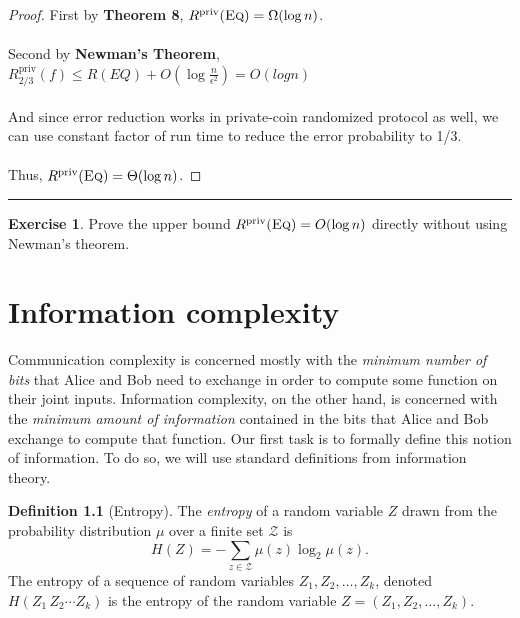 \documentclass[11pt,oneside]{book}
\theoremstyle{plain}
\theoremstyle{definition}
\newtheorem{definition}{Definition}
\newtheorem{exercise}{Exercise}
\theoremstyle{plain}
\newcommand{\calZ}{\mathcal{Z}}
\newcommand{\Eq}{\textsc{Eq}}
\newcommand{\Rpriv}{R^{\mathrm{priv}}}
\newcommand{\exercises}{\bigskip \noindent\rule{8cm}{0.4pt} \medskip}
\begin{document}
\begin{proof}
	First by \textbf{Theorem 8}, $\Rpriv(\Eq) = \Omega( \log n)$.\\
	\\
	Second by \textbf{Newman's Theorem}, $\Rpriv_{2/3}(f) \le R(EQ) + O\left(\log \frac{n}{\epsilon^2}\right) = O(logn)$\\
	\\
	And since error reduction works in private-coin randomized protocol as well, we can use constant factor of run time to reduce the error probability to 1/3.\\
	\\
	Thus, $\Rpriv(\Eq) = \Theta( \log n)$.
\end{proof}

\exercises

\begin{exercise}
	Prove the upper bound $\Rpriv(\Eq) = O( \log n)$ directly without using Newman's theorem.
\end{exercise}

	



\chapter[CH05]{Information complexity}

Communication complexity is concerned mostly with the \emph{minimum number of bits} that Alice and Bob need to exchange in order to compute some function on
their joint inputs. Information complexity, on the other hand, is concerned with
the \emph{minimum amount of information} contained in the bits that Alice and
Bob exchange to compute that function. Our first task is to formally define this notion of information. To do so, we will use standard definitions from information theory.
\newpage
\begin{definition}[Entropy]
	The \emph{entropy} of a random variable $Z$ drawn from the probability distribution $\mu$ over a finite set $\calZ$ is
	\[
	H(Z) = - \sum_{z \in \calZ} \mu(z) \log_2 \mu(z).
	\]
	The entropy of a sequence of random variables $Z_1,Z_2,\ldots,Z_k$, denoted $H(Z_1\,Z_2\cdots Z_k)$ is the entropy of the random variable $Z = (Z_1,Z_2,\ldots,Z_k)$.
\end{definition}
\end{document}
